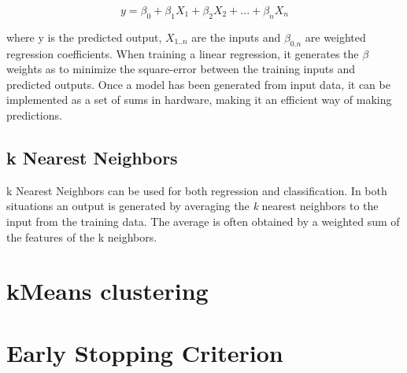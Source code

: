\begin{equation}
y = \beta_0 + \beta_1X_1 + \beta_2X_2 + ... + \beta_nX_n
\end{equation}

where y is the predicted output, $X_{1..n}$ are the inputs and $\beta_{0.n}$ are weighted regression coefficients.
When training a linear regression, it generates the $\beta$ weights as to minimize the square-error between the training inputs and predicted outputs.
Once a model has been generated from input data, it can be implemented as a set of sums in hardware, making it an efficient way of making predictions.

\subsection{k Nearest Neighbors}

k Nearest Neighbors can be used for both regression and classification.
In both situations an output is generated by averaging the \textit{k} nearest neighbors to the input from the training data.
The average is often obtained by a weighted sum of the features of the k neighbors.

\section{kMeans clustering}
\section{Early Stopping Criterion}